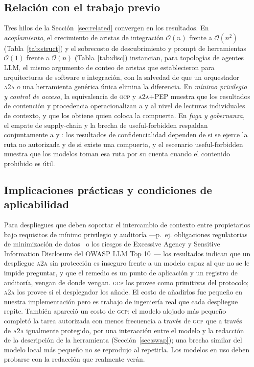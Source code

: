 \documentclass[conference,letterpaper]{IEEEtran}
\newcommand{\gcp}{\textsc{gcp}}
\newcommand{\ata}{\textsc{a2a}}
\newcommand{\bigoh}{\mathcal{O}}
\begin{document}
\subsection{Relación con el trabajo previo}
Tres hilos de la Sección~\ref{sec:related} convergen en los resultados. En \emph{acoplamiento}, el
crecimiento de aristas de integración $\bigoh(n)$ frente a $\bigoh(n^2)$ (Tabla~\ref{tab:struct}) y el
sobrecosto de descubrimiento y prompt de herramientas $\bigoh(1)$ frente a $\bigoh(n)$
(Tabla~\ref{tab:disc}) instancian, para topologías de agentes LLM, el mismo argumento de conteo de
aristas que \citet{parnas1972,stevens1974,briand1999,hohpe2003} establecieron para arquitecturas de
software e integración, con la salvedad de que un orquestador \ata{} o una herramienta genérica única
elimina la diferencia. En \emph{mínimo privilegio y control de acceso}, la equivalencia de \gcp{} y
\ata{}+PEP muestra que los resultados de contención y procedencia operacionalizan a \citet{saltzer1975} y
\citet{sandhu1996} al nivel de lecturas individuales de contexto, y que los obtiene quien coloca la
compuerta. En \emph{fuga y gobernanza}, el empate de supply-chain y la brecha de useful-forbidden
respaldan conjuntamente a \citet{evertz2024whispers} y \citet{elyagoubi2026agentleak}: los resultados de
confidencialidad dependen de si se ejerce la ruta no autorizada y de si existe una compuerta, y el
escenario useful-forbidden muestra que los modelos toman esa ruta por su cuenta cuando el contenido
prohibido es útil.

\subsection{Implicaciones prácticas y condiciones de aplicabilidad}
Para despliegues que deben soportar el intercambio de contexto entre propietarios bajo requisitos de
mínimo privilegio y auditoría ---p.~ej. obligaciones regulatorias de minimización de
datos~\citep{gdpr2016} o los riesgos de Excessive Agency y Sensitive Information Disclosure del OWASP LLM
Top 10~\citep{owasp2025}--- los resultados indican que un despliegue \ata{} sin protección es inseguro
frente a un modelo capaz al que no se le impide preguntar, y que el remedio es un punto de aplicación y
un registro de auditoría, vengan de donde vengan. \gcp{} los provee como primitivas del protocolo;
\ata{} los provee si el desplegador los añade. El costo de añadirlos fue pequeño en nuestra
implementación pero es trabajo de ingeniería real que cada despliegue repite. También apareció un costo
de \gcp{}: el modelo alojado más pequeño completó la tarea autorizada con menos frecuencia a través de \gcp{}
que a través de \ata{} igualmente protegido, por una interacción entre el modelo y la redacción de la
descripción de la herramienta (Sección~\ref{sec:swap}); una brecha similar del modelo local más pequeño
no se reprodujo al repetirla. Los modelos en uso deben probarse con la redacción que realmente verán.
\end{document}
